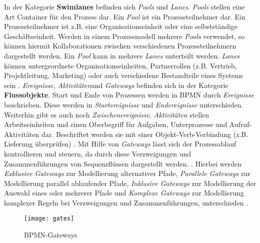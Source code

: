 In der Kategorie \textbf{Swimlanes} befinden sich \textit{Pools} und \textit{Lanes}. \textit{Pools} stellen eine Art Container für den Prozess dar. Ein \textit{Pool} ist ein Prozessteilnehmer dar. Ein Prozessteilnehmer ist z.B. eine Organisationseinheit oder eine selbstständige Geschäftseinheit. Werden in einem Prozessmodell mehrere \textit{Pools} verwendet, so können hiermit Kollaborationen zwischen verschiedenen Prozessteilnehmern dargestellt werden. Ein \textit{Pool} kann in mehrere \textit{Lanes} unterteilt werden. \textit{Lanes} können untergeordnete Organisationseinheiten, Partnerrollen (z.B. Vertrieb, Projektleitung, Marketing) oder auch verschiedene Bestandteile eines Systems sein \cite{gpfert2012, pitschke2010, allweyer2013}. \newline
 \textit{Ereignisse}, \textit{Aktivitäten}und \textit{Gateways} befinden sich in der Kategorie \textbf{Flussobjekte}.
Start und Ende von Prozessen werden in BPMN durch \textit{Ereignisse} beschrieben. Diese werden in  \textit{Startereignisse} und \textit{Endereignisse} unterschieden.  Weiterhin gibt es auch noch \textit{Zwischenereignisse}. \newline
\textit{Aktivitäten} stellen Arbeitseinheiten und einen Oberbegriff für Aufgaben, Unterprozesse und Aufruf-Aktivitäten dar. Beschriftet werden sie mit einer Objekt-Verb-Verbindung (z.B. Lieferung überprüfen) \cite{gpfert2012}. \newline
Mit Hilfe von \textit{Gateways} lässt sich der Prozessablauf kontrollieren und steuern, da durch diese Verzweigungen und Zusammenführungen von Sequenzflüssen dargestellt werden. \cite{gpfert2012, allweyer2013}. Hierbei werden \textit{Exklusive Gateways} zur Modellierung alternativer Pfade, \textit{Parallele Gateways} zur Modellierung parallel ablaufender Pfade, \textit{Inklusive Gateways} zur Modellierung der Auswahl eines oder mehrerer Pfade und \textit{Komplexe Gateways} zur Modellierung komplexer Regeln bei Verzweigungen und Zusammenführungen, unterschieden \cite{allweyer2013}.\newline 

\begin{figure}[H]
\begin{center}
  \texttt{[image: gates]} %
  \caption{BPMN-Gateways}
  \label{fig:gates}
\end{center}
\end{figure} 


